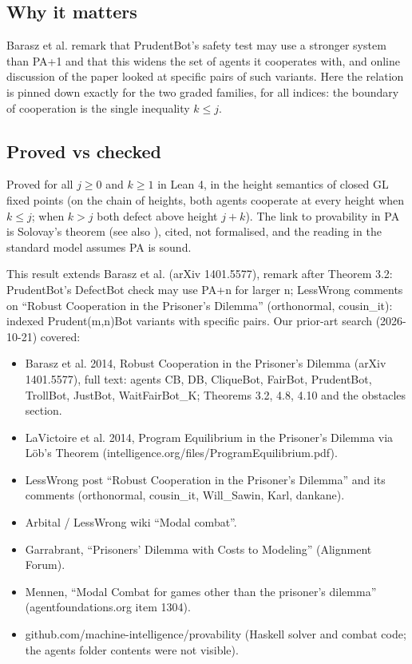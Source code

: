 \documentclass{article}
\begin{document}
\subsection*{Why it matters}

Barasz et al. remark that PrudentBot's safety test may use a stronger system than PA+1 and
that this widens the set of agents it cooperates with, and online discussion of the paper
looked at specific pairs of such variants. Here the relation is pinned down exactly for the
two graded families, for all indices: the boundary of cooperation is the single inequality
$k \le j$.

\subsection*{Proved vs checked}

Proved for all $j \ge 0$ and $k \ge 1$ in Lean 4, in the height semantics of closed GL fixed
points (on the chain of heights, both agents cooperate at every height when $k \le j$; when
$k > j$ both defect above height $j + k$). The link to provability in PA is Solovay's theorem
\cite{solovay1976provability} (see also \cite{boolos1993logic}), cited, not formalised, and the reading
in the standard model assumes PA is sound.

This result extends Barasz et al. (arXiv 1401.5577), remark after Theorem 3.2: PrudentBot's DefectBot check may use PA+n for larger n; LessWrong comments on ``Robust Cooperation in the Prisoner's Dilemma'' (orthonormal, cousin\_it): indexed Prudent(m,n)Bot variants with specific pairs. Our prior-art search (2026-10-21) covered:

\begin{itemize}
\item Barasz et al. 2014, Robust Cooperation in the Prisoner's Dilemma (arXiv 1401.5577), full text: agents CB, DB, CliqueBot, FairBot, PrudentBot, TrollBot, JustBot, WaitFairBot\_K; Theorems 3.2, 4.8, 4.10 and the obstacles section.
\item LaVictoire et al. 2014, Program Equilibrium in the Prisoner's Dilemma via Löb's Theorem (intelligence.org/files/ProgramEquilibrium.pdf).
\item LessWrong post ``Robust Cooperation in the Prisoner's Dilemma'' and its comments (orthonormal, cousin\_it, Will\_Sawin, Karl, dankane).
\item Arbital / LessWrong wiki ``Modal combat''.
\item Garrabrant, ``Prisoners' Dilemma with Costs to Modeling'' (Alignment Forum).
\item Mennen, ``Modal Combat for games other than the prisoner's dilemma'' (agentfoundations.org item 1304).
\item github.com/machine-intelligence/provability (Haskell solver and combat code; the agents folder contents were not visible).
\end{itemize}
\end{document}
